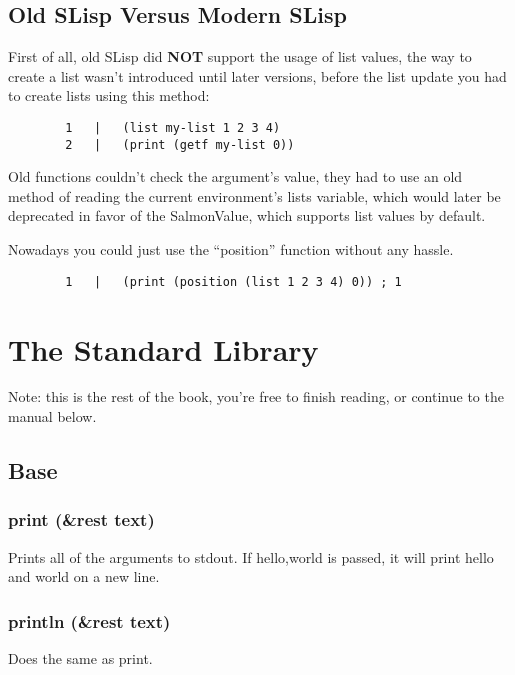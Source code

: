 \documentclass{article}
\begin{document}
	\subsection{Old SLisp Versus Modern SLisp}

	First of all, old SLisp did \textbf{NOT} support the usage of list values, the way to create a list wasn't
	introduced until later versions, before the list update you had to create lists using this method:

	\begin{lstlisting}
		1	|	(list my-list 1 2 3 4)
		2	|	(print (getf my-list 0))
	\end{lstlisting}

	Old functions couldn't check the argument's value, they had to use an old method of reading the current environment's
	lists variable, which would later be deprecated in favor of the SalmonValue, which supports list values by default.

	Nowadays you could just use the ``position'' function without any hassle.

	\begin{lstlisting}
		1	|	(print (position (list 1 2 3 4) 0)) ; 1
	\end{lstlisting}

	\newpage
	\section{The Standard Library}
	
	Note: this is the rest of the book, you're free to finish reading, or continue to the manual below.
	
	\subsection{Base}
	
	\subsubsection{print (\&rest text)}

	Prints all of the arguments to stdout. If {hello,world} is passed, it will print hello and world on a new line.
	
	\subsubsection{println (\&rest text)}
	
	Does the same as print.
	
\end{document}
